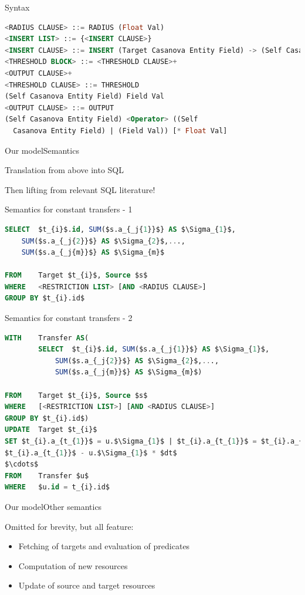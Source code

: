 \documentclass{beamer}
\begin{document}
\begin{frame}[fragile]{Syntax}
\begin{lstlisting}[language=sql]
<RADIUS CLAUSE> ::= RADIUS (Float Val)
<INSERT LIST> ::= {<INSERT CLAUSE>}
<INSERT CLAUSE> ::= INSERT (Target Casanova Entity Field) -> (Self Casanova Entity Field List)
<THRESHOLD BLOCK> ::= <THRESHOLD CLAUSE>+
<OUTPUT CLAUSE>+
<THRESHOLD CLAUSE> ::= THRESHOLD
(Self Casanova Entity Field) Field Val
<OUTPUT CLAUSE> ::= OUTPUT
(Self Casanova Entity Field) <Operator> ((Self 
  Casanova Entity Field) | (Field Val)) [* Float Val]
\end{lstlisting}
\end{frame}

\begin{slide}{Our model}{Semantics}{
\item Translation from above into SQL
\item Then lifting from relevant SQL literature!
}\end{slide}

\begin{frame}[fragile]{Semantics for constant transfers - 1}
\begin{lstlisting}[language=sql]
SELECT	$t_{i}$.id, SUM($s.a_{_j{1}}$} AS $\Sigma_{1}$,
	SUM($s.a_{_j{2}}$} AS $\Sigma_{2}$,...,
	SUM($s.a_{_j{m}}$} AS $\Sigma_{m}$

FROM	Target $t_{i}$, Source $s$
WHERE	<RESTRICTION LIST> [AND <RADIUS CLAUSE>]
GROUP BY $t_{i}.id$
\end{lstlisting}
\end{frame}

\begin{frame}[fragile]{Semantics for constant transfers - 2}
\begin{lstlisting}[language=sql]
WITH	Transfer AS(
		SELECT	$t_{i}$.id, SUM($s.a_{_j{1}}$} AS $\Sigma_{1}$,
			SUM($s.a_{_j{2}}$} AS $\Sigma_{2}$,...,
			SUM($s.a_{_j{m}}$} AS $\Sigma_{m}$)

FROM	Target $t_{i}$, Source $s$
WHERE	[<RESTRICTION LIST>] [AND <RADIUS CLAUSE>]
GROUP BY $t_{i}.id$)
UPDATE	Target $t_{i}$
SET	$t_{i}.a_{t_{1}}$ = u.$\Sigma_{1}$ | $t_{i}.a_{t_{1}}$ = $t_{i}.a_{t_{1}}$ + u.$\Sigma_{1}$ * $dt$ | $t_{i}.a_{t_{1}}$ =
$t_{i}.a_{t_{1}}$ - u.$\Sigma_{1}$ * $dt$
$\cdots$
FROM	Transfer $u$
WHERE	$u.id = t_{i}.id$
\end{lstlisting}
\end{frame}

\begin{slide}{Our model}{Other semantics}{
\item Omitted for brevity, but all feature:
\begin{itemize}
\item Fetching of targets and evaluation of predicates
\item Computation of new resources
\item Update of source and target resources
\end{itemize}
}\end{slide}
\end{document}
